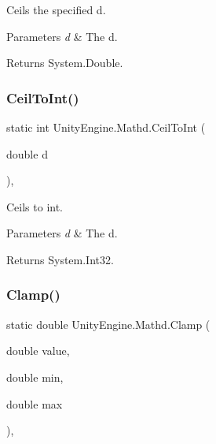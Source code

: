 Ceils the specified d. 


\begin{DoxyParams}{Parameters}
{\em d} & The d.\\
\hline
\end{DoxyParams}
\begin{DoxyReturn}{Returns}
System.\+Double.
\end{DoxyReturn}
\mbox{\label{struct_unity_engine_1_1_mathd_a0f248ef2890d088a213ca87c323f7977}} 
\subsubsection{\texorpdfstring{Ceil\+To\+Int()}{CeilToInt()}}
{\footnotesize\ttfamily static int Unity\+Engine.\+Mathd.\+Ceil\+To\+Int (\begin{DoxyParamCaption}\item[{double}]{d }\end{DoxyParamCaption})\hspace{0.3cm}{\ttfamily [inline]}, {\ttfamily [static]}}



Ceils to int. 


\begin{DoxyParams}{Parameters}
{\em d} & The d.\\
\hline
\end{DoxyParams}
\begin{DoxyReturn}{Returns}
System.\+Int32.
\end{DoxyReturn}
\mbox{\label{struct_unity_engine_1_1_mathd_a209be08d7d0f1f474d6db6f3c26e2b24}} 
\subsubsection{\texorpdfstring{Clamp()}{Clamp()}\hspace{0.1cm}{\footnotesize\ttfamily [1/2]}}
{\footnotesize\ttfamily static double Unity\+Engine.\+Mathd.\+Clamp (\begin{DoxyParamCaption}\item[{double}]{value,  }\item[{double}]{min,  }\item[{double}]{max }\end{DoxyParamCaption})\hspace{0.3cm}{\ttfamily [inline]}, {\ttfamily [static]}}




